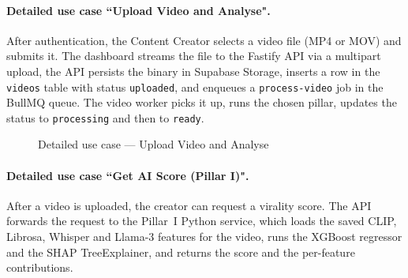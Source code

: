 \paragraph{Detailed use case ``Upload Video and Analyse".}
After authentication, the Content Creator selects a video file (MP4 or MOV) and submits it.
The dashboard streams the file to the Fastify API via a multipart upload, the API persists
the binary in Supabase Storage, inserts a row in the \texttt{videos} table with status
\texttt{uploaded}, and enqueues a \texttt{process-video} job in the BullMQ queue. The video
worker picks it up, runs the chosen pillar, updates the status to \texttt{processing} and then
to \texttt{ready}.

\begin{figure}[H]
\centering
{}
\caption{Detailed use case --- Upload Video and Analyse}
\label{fig:uc_upload}
\end{figure}

\paragraph{Detailed use case ``Get AI Score (Pillar I)".}
After a video is uploaded, the creator can request a virality score. The API forwards the
request to the Pillar~I Python service, which loads the saved CLIP, Librosa, Whisper and
Llama-3 features for the video, runs the XGBoost regressor and the SHAP TreeExplainer, and
returns the score and the per-feature contributions.

